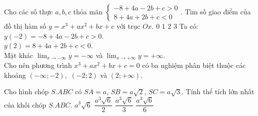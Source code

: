 \begin{ex}%
Cho các số thực $a,b,c$ thỏa mãn $\left\{\begin{array}{l}
-8+4a-2b+c>0 \\ 8+4a+2b+c<0
\end{array}\right.$. Tìm số giao điểm của đồ thị hàm số $y=x^3+ax^2+bx+c$ với trục $Ox$.
 \choice
  {$0$}
  {$1$}
  {$2$}
  {\True $3$}
 \loigiai
  {
  Ta có:\\
  $y(-2)=-8+4a-2b+c>0$.\\
  $y(2)=8+4a+2b+c<0$.\\
  Mặt khác $\displaystyle\lim_{x\rightarrow -\infty}y=-\infty$ và $\displaystyle\lim_{x\rightarrow +\infty}y=+\infty$.\\
  Cho nên phương trình $x^3+ax^2+bx+c=0$ có ba nghiệm phân biệt thuộc các khoảng $(-\infty;-2),$ $(-2;2)$ và $(2;+\infty)$.
  }
\end{ex}



\begin{ex}%
Cho hình chóp $S.ABC$ có $SA=a$, $SB=a\sqrt{2}$, $SC=a\sqrt{3}$. Tính thể tích lớn nhất của khối chóp $S.ABC$.
 \choice
  {$a^3\sqrt{6}$}
  {$\dfrac{a^3\sqrt{6}}{2}$}
  {$\dfrac{a^3\sqrt{6}}{3}$}
  {\True $\dfrac{a^3\sqrt{6}}{6}$}
 \loigiai
  {
  {
  }
  }
\end{ex}



